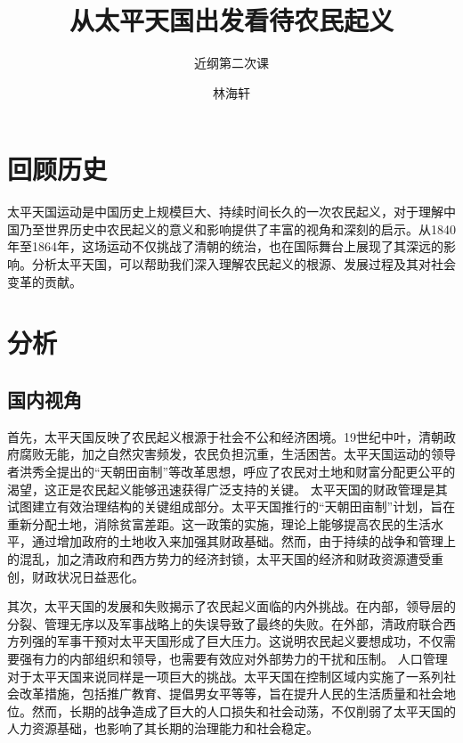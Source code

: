 \documentclass[10pt,a4paper]{beamer} %
\begin{document}
	
	\title{从太平天国出发看待农民起义}
	\subtitle{近纲第二次课}
	\author{林海轩}
	\date{}
	
	\begin{frame}
		\titlepage
	\end{frame}
	
	\begin{frame}
		\tableofcontents
	\end{frame}
	
	
	\section{回顾历史}
	\begin{frame}
		太平天国运动是中国历史上规模巨大、持续时间长久的一次农民起义，对于理解中国乃至世界历史中农民起义的意义和影响提供了丰富的视角和深刻的启示。从1840年至1864年，这场运动不仅挑战了清朝的统治，也在国际舞台上展现了其深远的影响。分析太平天国，可以帮助我们深入理解农民起义的根源、发展过程及其对社会变革的贡献。
	\end{frame}
	
	\section{分析}
	\subsection{国内视角}
	\begin{frame}
		首先，太平天国反映了农民起义根源于社会不公和经济困境。19世纪中叶，清朝政府腐败无能，加之自然灾害频发，农民负担沉重，生活困苦。太平天国运动的领导者洪秀全提出的“天朝田亩制”等改革思想，呼应了农民对土地和财富分配更公平的渴望，这正是农民起义能够迅速获得广泛支持的关键。
		太平天国的财政管理是其试图建立有效治理结构的关键组成部分。太平天国推行的“天朝田亩制”计划，旨在重新分配土地，消除贫富差距。这一政策的实施，理论上能够提高农民的生活水平，通过增加政府的土地收入来加强其财政基础。然而，由于持续的战争和管理上的混乱，加之清政府和西方势力的经济封锁，太平天国的经济和财政资源遭受重创，财政状况日益恶化。
	\end{frame}
	\begin{frame}
		其次，太平天国的发展和失败揭示了农民起义面临的内外挑战。在内部，领导层的分裂、管理无序以及军事战略上的失误导致了最终的失败。在外部，清政府联合西方列强的军事干预对太平天国形成了巨大压力。这说明农民起义要想成功，不仅需要强有力的内部组织和领导，也需要有效应对外部势力的干扰和压制。
		人口管理对于太平天国来说同样是一项巨大的挑战。太平天国在控制区域内实施了一系列社会改革措施，包括推广教育、提倡男女平等等，旨在提升人民的生活质量和社会地位。然而，长期的战争造成了巨大的人口损失和社会动荡，不仅削弱了太平天国的人力资源基础，也影响了其长期的治理能力和社会稳定。
	\end{frame}
	
\end{document}
